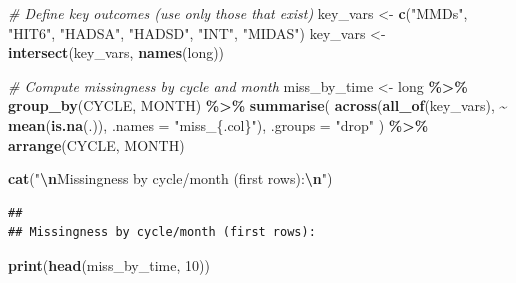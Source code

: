 \documentclass[
]{article}
\newenvironment{Shaded}{\begin{snugshade}}{\end{snugshade}}
\newcommand{\AttributeTok}[1]{\textcolor[rgb]{0.13,0.29,0.53}{#1}}
\newcommand{\CommentTok}[1]{\textcolor[rgb]{0.56,0.35,0.01}{\textit{#1}}}
\newcommand{\DecValTok}[1]{\textcolor[rgb]{0.00,0.00,0.81}{#1}}
\newcommand{\FunctionTok}[1]{\textcolor[rgb]{0.13,0.29,0.53}{\textbf{#1}}}
\newcommand{\NormalTok}[1]{#1}
\newcommand{\OtherTok}[1]{\textcolor[rgb]{0.56,0.35,0.01}{#1}}
\newcommand{\SpecialCharTok}[1]{\textcolor[rgb]{0.81,0.36,0.00}{\textbf{#1}}}
\newcommand{\StringTok}[1]{\textcolor[rgb]{0.31,0.60,0.02}{#1}}
\begin{document}
\begin{Shaded}
\begin{Highlighting}[]
\CommentTok{\# Define key outcomes (use only those that exist)}
\NormalTok{key\_vars }\OtherTok{\textless{}{-}} \FunctionTok{c}\NormalTok{(}\StringTok{"MMDs"}\NormalTok{, }\StringTok{"HIT6"}\NormalTok{, }\StringTok{"HADSA"}\NormalTok{, }\StringTok{"HADSD"}\NormalTok{, }\StringTok{"INT"}\NormalTok{, }\StringTok{"MIDAS"}\NormalTok{)}
\NormalTok{key\_vars }\OtherTok{\textless{}{-}} \FunctionTok{intersect}\NormalTok{(key\_vars, }\FunctionTok{names}\NormalTok{(long))}

\CommentTok{\# Compute missingness by cycle and month}
\NormalTok{miss\_by\_time }\OtherTok{\textless{}{-}}\NormalTok{ long }\SpecialCharTok{\%\textgreater{}\%}
  \FunctionTok{group\_by}\NormalTok{(CYCLE, MONTH) }\SpecialCharTok{\%\textgreater{}\%}
  \FunctionTok{summarise}\NormalTok{(}
    \FunctionTok{across}\NormalTok{(}\FunctionTok{all\_of}\NormalTok{(key\_vars), }\SpecialCharTok{\textasciitilde{}} \FunctionTok{mean}\NormalTok{(}\FunctionTok{is.na}\NormalTok{(.)), }\AttributeTok{.names =} \StringTok{"miss\_\{.col\}"}\NormalTok{),}
            \AttributeTok{.groups =} \StringTok{"drop"}
\NormalTok{    ) }\SpecialCharTok{\%\textgreater{}\%}
  \FunctionTok{arrange}\NormalTok{(CYCLE, MONTH)}

\FunctionTok{cat}\NormalTok{(}\StringTok{"}\SpecialCharTok{\textbackslash{}n}\StringTok{Missingness by cycle/month (first rows):}\SpecialCharTok{\textbackslash{}n}\StringTok{"}\NormalTok{)}
\end{Highlighting}
\end{Shaded}

\begin{verbatim}
## 
## Missingness by cycle/month (first rows):
\end{verbatim}

\begin{Shaded}
\begin{Highlighting}[]
\FunctionTok{print}\NormalTok{(}\FunctionTok{head}\NormalTok{(miss\_by\_time, }\DecValTok{10}\NormalTok{))}
\end{Highlighting}
\end{Shaded}
\end{document}

